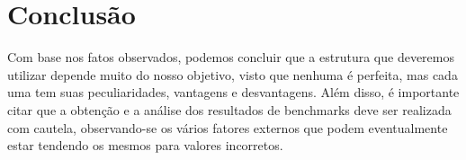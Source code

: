 \newpage
\section{Conclusão}\label{sec:conclusion}
	Com base nos fatos observados, podemos concluir que a estrutura que deveremos utilizar depende muito do nosso objetivo, visto que nenhuma é perfeita, mas cada uma tem suas peculiaridades, vantagens e desvantagens. Além disso, é importante citar que a obtenção e a análise dos resultados de benchmarks deve ser realizada com cautela, observando-se os vários fatores externos que podem eventualmente estar tendendo os mesmos para valores incorretos.
